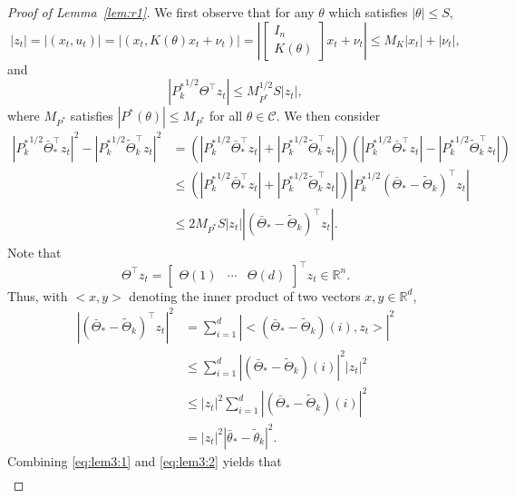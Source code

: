 \documentclass[11pt]{article}
\theoremstyle{plain}
\theoremstyle{definition}
\theoremstyle{remark}
\begin{document}
\begin{proof}[Proof of Lemma~\ref{lem:r1}]
We first observe that for any $\theta$ which satisfies $|\theta| \leq S$,
\[
|z_t|  = | (x_t, u_t) | = | (x_t, K(\theta) x_t+ \nu_t) |
= \left | \begin{bmatrix}
I_n\\
K(\theta)
\end{bmatrix} x_t + \nu_t
\right | \leq M_K |x_t| + |\nu_t|,
\]
and
\[
| {P^*_k}^{1/2} \Theta^\top z_t | \leq M_{P^*}^{1/2} S |z_t|, 
\]
where $M_{P^*}$ satisfies $|P^*(\theta)| \leq M_{P^*}$ for all $\theta \in \mathcal{C}$.
We then consider 
\begin{equation}\label{eq:lem3:1}
\begin{split}
 |{P^*_k}^{1/2} \bar{\Theta}_*^\top z_t |^2 - |{P^*_k}^{1/2} \tilde{\Theta}_k^\top z_t |^2 &= (|{P^*_k}^{1/2} \bar{\Theta}_*^\top z_t | + |{P^*_k}^{1/2} \tilde{\Theta}_k^\top z_t |) (|{P^*_k}^{1/2} \bar{\Theta}_*^\top z_t | - |{P^*_k}^{1/2} \tilde{\Theta}_k^\top z_t |)\\
 &\leq (|{P^*_k}^{1/2} \bar{\Theta}_*^\top z_t | + |{P^*_k}^{1/2} \tilde{\Theta}_k^\top z_t |) | {P^*_k}^{1/2} (\bar{\Theta}_* - \tilde{\Theta}_k)^\top z_t |\\
 &\leq 2 M_{P^*}  S |z_t| |  (\bar{\Theta}_* - \tilde{\Theta}_k)^\top z_t |.
 \end{split}
\end{equation}
Note that 
\[
\Theta^\top z_t = \begin{bmatrix}  {\Theta}(1) & \cdots & {\Theta} (d)\end{bmatrix}^\top z_t \in \mathbb{R}^n.
\]
Thus, with $<x,y>$ denoting the inner product of two vectors $x,y\in \mathbb{R}^d$,
\begin{equation}\label{eq:lem3:2}
\begin{split}
|  (\bar{\Theta}_* - \tilde{\Theta}_k)^\top z_t |^2 &=  \sum_{i=1}^d | <(\bar{\Theta}_* - \tilde{\Theta}_k)(i), z_t>|^2\\
&\leq \sum_{i=1}^d| (\bar{\Theta}_* - \tilde{\Theta}_k) (i)|^2 |z_t|^2\\
&\leq |z_t|^2 \sum_{i=1}^d | (\bar{\Theta}_* - \tilde{\Theta}_k) (i)|^2\\
&= |z_t|^2 |\bar{\theta}_* - \tilde{\theta}_k|^2.
\end{split}
\end{equation}
Combining \eqref{eq:lem3:1} and \eqref{eq:lem3:2} yields that
\begin{equation}\label{eq:lem3:3}
\begin{split}

\end{split}
\end{equation}
\end{proof}
\end{document}

